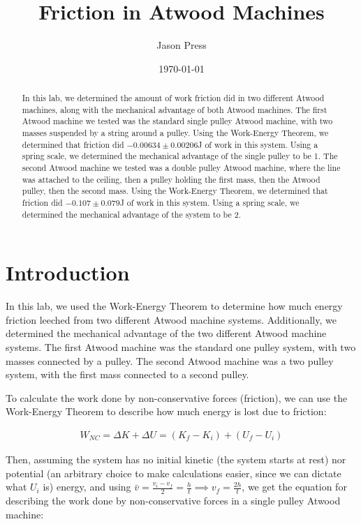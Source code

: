 \documentclass[12pt]{article}
\author{Jason Press}
\date{\today}
\title{Friction in Atwood Machines}
\begin{document}
\maketitle
\begin{abstract}


In this lab, we determined the amount of work friction did in two different Atwood machines, along with the mechanical advantage of both Atwood machines. The first Atwood machine we tested was the standard single pulley Atwood machine, with two masses suspended by a string around a pulley. Using the Work-Energy Theorem, we determined that friction did \(-0.00634 \pm 0.00206\)J of work in this system. Using a spring scale, we determined the mechanical advantage of the single pulley to be 1. The second Atwood machine we tested was a double pulley Atwood machine, where the line was attached to the ceiling, then a pulley holding the first mass, then the Atwood pulley, then the second mass. Using the Work-Energy Theorem, we determined that friction did \(-0.107 \pm 0.079\)J of work in this system. Using a spring scale, we determined the mechanical advantage of the system to be 2.
\end{abstract}
\section{Introduction}
\label{sec:orgadc3537}

In this lab, we used the Work-Energy Theorem to determine how much energy friction leeched from two different Atwood machine systems. Additionally, we determined the mechanical advantage of the two different Atwood machine systems. The first Atwood machine was the standard one pulley system, with two masses connected by a pulley. The second Atwood machine was a two pulley system, with the first mass connected to a second pulley.

To calculate the work done by non-conservative forces (friction), we can use the Work-Energy Theorem to describe how much energy is lost due to friction:

\begin{align*}
W_{NC} = \Delta K + \Delta U = (K_f - K_i) + (U_f - U_i)
\end{align*}

Then, assuming the system has no initial kinetic (the system starts at rest) nor potential (an arbitrary choice to make calculations easier, since we can dictate what \(U_i\) is) energy, and using \(\bar{v} = \frac{v_i - v_{f}}{2} = \frac{h}{t} \implies v_f = \frac{2h}{t}\), we get the equation for describing the work done by non-conservative forces in a single pulley Atwood machine:
\end{document}
